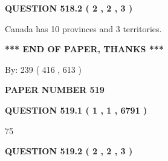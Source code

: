 \documentclass[12pt]{article}
\begin{document}
\vspace{0.2in}
  
{\textbf{\Large{QUESTION
518.2 
 ( 2 , 2 , 3 )
}}}
  
  
 
 
\noindent{}
 
 
Canada has 10  provinces and 3 territories.
 
 
 
 
   
   
 \vspace{0.2in}
 
   
   
   
   
\vspace{1.0in} 
{\textbf{\large{ *** END OF PAPER, THANKS *** }}} 
   
   
\hspace{1.0in} By: 
 239 ( 416 ,  613 )
   
   
   
   
\newpage 
\setcounter{page}{ 
   519001 } 
   
   
   
   
 {\textbf{ \Large{ PAPER NUMBER  519  }}}
   
   
\vspace{0.2in}
   
   
   
   
   
   
 \vspace{0.2in}
 
 
 
 
   
   
  
\vspace{0.2in}
  
{\textbf{\Large{QUESTION
519.1 
 ( 1 , 1 , 6791 )
}}}
  
  
 
 
\noindent{}

75
 
 
  
\vspace{0.2in}
  
{\textbf{\Large{QUESTION
519.2 
 ( 2 , 2 , 3 )
}}}
  
  
 
\end{document}
